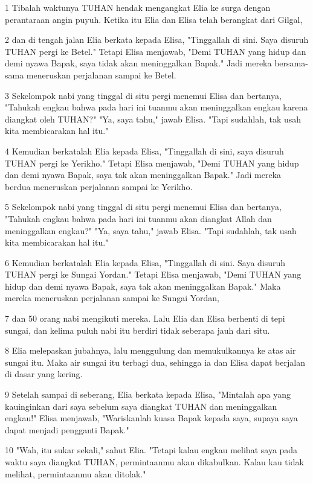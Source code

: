 \par 1 Tibalah waktunya TUHAN hendak mengangkat Elia ke surga dengan perantaraan angin puyuh. Ketika itu Elia dan Elisa telah berangkat dari Gilgal,
\par 2 dan di tengah jalan Elia berkata kepada Elisa, "Tinggallah di sini. Saya disuruh TUHAN pergi ke Betel." Tetapi Elisa menjawab, "Demi TUHAN yang hidup dan demi nyawa Bapak, saya tidak akan meninggalkan Bapak." Jadi mereka bersama-sama meneruskan perjalanan sampai ke Betel.
\par 3 Sekelompok nabi yang tinggal di situ pergi menemui Elisa dan bertanya, "Tahukah engkau bahwa pada hari ini tuanmu akan meninggalkan engkau karena diangkat oleh TUHAN?" "Ya, saya tahu," jawab Elisa. "Tapi sudahlah, tak usah kita membicarakan hal itu."
\par 4 Kemudian berkatalah Elia kepada Elisa, "Tinggallah di sini, saya disuruh TUHAN pergi ke Yerikho." Tetapi Elisa menjawab, "Demi TUHAN yang hidup dan demi nyawa Bapak, saya tak akan meninggalkan Bapak." Jadi mereka berdua meneruskan perjalanan sampai ke Yerikho.
\par 5 Sekelompok nabi yang tinggal di situ pergi menemui Elisa dan bertanya, "Tahukah engkau bahwa pada hari ini tuanmu akan diangkat Allah dan meninggalkan engkau?" "Ya, saya tahu," jawab Elisa. "Tapi sudahlah, tak usah kita membicarakan hal itu."
\par 6 Kemudian berkatalah Elia kepada Elisa, "Tinggallah di sini. Saya disuruh TUHAN pergi ke Sungai Yordan." Tetapi Elisa menjawab, "Demi TUHAN yang hidup dan demi nyawa Bapak, saya tak akan meninggalkan Bapak." Maka mereka meneruskan perjalanan sampai ke Sungai Yordan,
\par 7 dan 50 orang nabi mengikuti mereka. Lalu Elia dan Elisa berhenti di tepi sungai, dan kelima puluh nabi itu berdiri tidak seberapa jauh dari situ.
\par 8 Elia melepaskan jubahnya, lalu menggulung dan memukulkannya ke atas air sungai itu. Maka air sungai itu terbagi dua, sehingga ia dan Elisa dapat berjalan di dasar yang kering.
\par 9 Setelah sampai di seberang, Elia berkata kepada Elisa, "Mintalah apa yang kauinginkan dari saya sebelum saya diangkat TUHAN dan meninggalkan engkau!" Elisa menjawab, "Wariskanlah kuasa Bapak kepada saya, supaya saya dapat menjadi pengganti Bapak."
\par 10 "Wah, itu sukar sekali," sahut Elia. "Tetapi kalau engkau melihat saya pada waktu saya diangkat TUHAN, permintaanmu akan dikabulkan. Kalau kau tidak melihat, permintaanmu akan ditolak."
